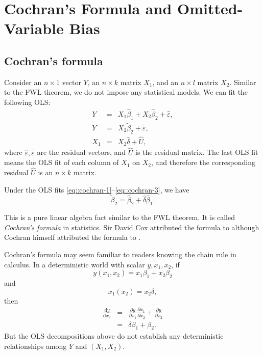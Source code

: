  
\chapter{Cochran's Formula and Omitted-Variable Bias}
 \label{chapter::cochran-ovb}
 
 
\section{Cochran's formula} 
 
 Consider an $n\times 1$ vector $Y$, an $n\times k$ matrix $X_1$, and an $n\times l$ matrix $X_2$. Similar to the FWL theorem, we do not impose any statistical models. 
We can fit the following OLS:
\begin{eqnarray}
Y &=& X_1 \hat{\beta}_1 + X_2 \hat{\beta}_2+ \hat{\varepsilon},  \label{eq::cochran-1} \\
Y &=& X_2 \tilde{\beta}_2 + \tilde{\varepsilon} ,\label{eq::cochran-2} \\
X_1 &=& X_2 \hat{\delta} + \hat{U}, \label{eq::cochran-3} 
\end{eqnarray}
where $\hat{\varepsilon}, \tilde{\varepsilon}$ are the residual vectors, and $\hat{U}$ is the residual matrix. 
The last OLS fit means the OLS fit of each column of $X_1$ on $X_2$, and therefore the corresponding residual $\hat{U}$ is an $n\times k$ matrix.
 

 \begin{theorem}
 \label{thm::cochran-formula}
 Under the OLS fits \eqref{eq::cochran-1}--\eqref{eq::cochran-3}, we have 
 $$
\tilde{\beta}_2 = \hat{\beta}_2 +  \hat{\delta} \hat{\beta}_1.
$$
 \end{theorem}
 
This is a pure linear algebra fact similar to the FWL theorem. It is called {\it Cochran's formula} in statistics. Sir David Cox \citep{cox2007generalization} attributed the formula to \citet{cochran1938omission} although Cochran himself attributed the formula to \citet{fisher1925statistical}. 


Cochran's formula may seem familiar to readers knowing the chain rule in calculus. In a deterministic world with scalar $y, x_1, x_2$, if
$$
y(x_1, x_2) = x_1  \beta_1 + x_2  \beta_2
$$
and
$$
x_1(x_2) = x_2  \delta,
$$
then
\begin{eqnarray*}
\frac{  \text{d} y }{  \text{d}x_2 } 
&=&   \frac{  \partial y }{ \partial x_1 }   \frac{  \partial x_1 }{ \partial x_2 }  + \frac{  \partial y }{ \partial x_2 }  \\
&=&  \delta   \beta_1 + \beta_2. 
\end{eqnarray*}
But the OLS decompositions above do not establish any deterministic relationships among $Y$ and $(X_1, X_2)$. 



